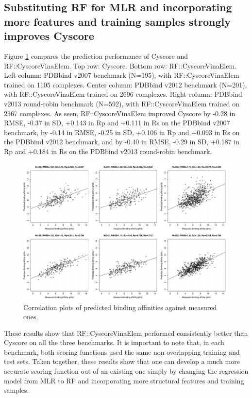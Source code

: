 \subsection{Substituting RF for MLR and incorporating more features and training samples strongly improves Cyscore}

Figure \ref{rfcyscore:cor} compares the prediction performance of Cyscore and RF::CyscoreVinaElem. Top row: Cyscore. Bottom row: RF::CyscoreVinaElem. Left column: PDBbind v2007 benchmark (N=195), with RF::CyscoreVinaElem trained on 1105 complexes. Center column: PDBbind v2012 benchmark (N=201), with RF::CyscoreVinaElem trained on 2696 complexes. Right column: PDBbind v2013 round-robin benchmark (N=592), with RF::CyscoreVinaElem trained on 2367 complexes. As seen, RF::CyscoreVinaElem improved Cyscore by -0.28 in RMSE, -0.37 in SD, +0.143 in Rp and +0.111 in Rs on the PDBbind v2007 benchmark, by -0.14 in RMSE, -0.25 in SD, +0.106 in Rp and +0.093 in Rs on the PDBbind v2012 benchmark, and by -0.40 in RMSE, -0.29 in SD, +0.187 in Rp and +0.184 in Rs on the PDBbind v2013 round-robin benchmark.

\begin{figure}
\includegraphics[width=\linewidth]{../rfcyscore/cor.pdf}
\caption{Correlation plots of predicted binding affinities against measured ones.}
\label{rfcyscore:cor}
\end{figure}

These results show that RF::CyscoreVinaElem performed consistently better than Cyscore on all the three benchmarks. It is important to note that, in each benchmark, both scoring functions used the same non-overlapping training and test sets. Taken together, these results show that one can develop a much more accurate scoring function out of an existing one simply by changing the regression model from MLR to RF and incorporating more structural features and training samples.

